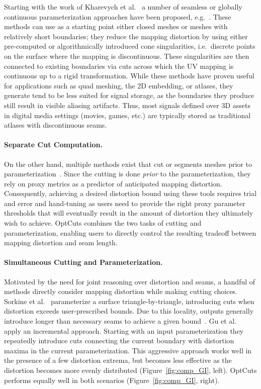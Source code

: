 Starting with the work of Kharevych et al.~ a number of seamless or globally continuous parameterization approaches have been proposed, e.g.\ \cite{Ray,Myles,Aigerman}. These methods can use as a starting point either closed meshes or meshes with relatively short boundaries; they reduce the mapping distortion by using either pre-computed or algorithmically introduced cone singularities, i.e.\ discrete points on the surface where the mapping is discontinuous. These singularities are then connected to existing boundaries via cuts across which the UV mapping is continuous up to a rigid transformation.  While these methods have proven useful for applications such as quad meshing, the 2D embedding, or atlases, they generate tend to be less suited for signal storage, as the boundaries they produce still result in visible aliasing artifacts. Thus, most signals defined over 3D assets in digital media settings (movies, games, etc.) are typically stored as traditional atlases with discontinuous seams.  

\paragraph{Separate Cut Computation.}
On the other hand, multiple methods exist that cut or segments meshes prior to parameterization~\cite{Sheffer2002Seamster,Julius2005D,Snyder2003Multi,Levy2002}.
Since the cutting is done \emph{prior} to the parameterization, they rely on proxy metrics as a predictor of anticipated mapping distortion. Consequently, achieving a desired distortion bound using these tools requires trial and error and hand-tuning as users need to provide the right proxy parameter thresholds that will eventually result in the amount of distortion they ultimately wish to achieve. OptCuts combines the two tasks of cutting and parameterization, enabling users to directly control the resulting tradeoff between mapping distortion and seam length. 

\paragraph{Simultaneous Cutting and Parameterization.}
Motivated by the need for joint reasoning over distortion and seams, a handful of methods directly consider mapping distortion while making cutting choices. 
Sorkine et al.~ parameterize a surface triangle-by-triangle, introducing cuts when distortion exceeds user-prescribed bounds. Due to this locality, outputs generally introduce longer than necessary seams to achieve a given bound~\cite{Hormann2008,Poranne2017Autocuts}. 
Gu et al.~ apply an incremental approach. Starting with an input parameterization they repeatedly introduce cuts connecting the current boundary with distortion maxima in the current parameterization. This aggressive approach works well in the presence of a few distortion extrema, but becomes less effective as the distortion becomes more evenly distributed (Figure~\ref{fig:comp_GI}, left). OptCuts performs equally well in both scenarios (Figure~\ref{fig:comp_GI}, right).  

